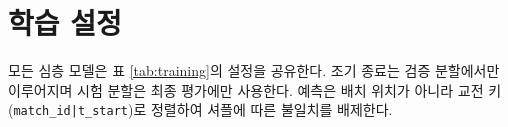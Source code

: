 
\section{학습 설정}
\label{sec:setup-training}



모든 심층 모델은 표 \ref{tab:training}의 설정을 공유한다. 조기 종료는 검증 분할에서만 이루어지며 시험 분할은 최종 평가에만 사용한다. 예측은 배치 위치가 아니라 교전 키(\texttt{match\_id|t\_start})로 정렬하여 셔플에 따른 불일치를 배제한다.
